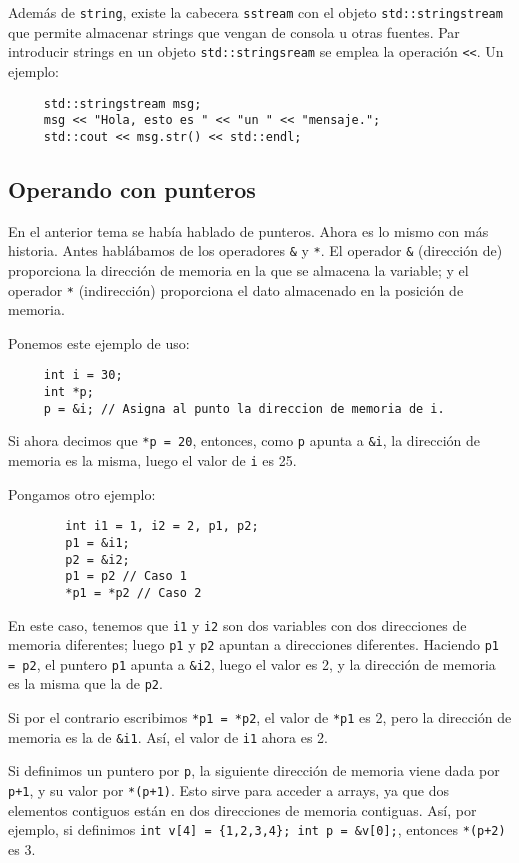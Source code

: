 \documentclass[a4paper]{article}
\begin{document}
	 Además de \verb|string|, existe la cabecera \verb|sstream| con el objeto \verb|std::stringstream| que permite almacenar strings que vengan de consola u otras fuentes. Par introducir strings en un objeto \verb|std::stringsream| se emplea la operación \verb|<<|. Un ejemplo:
	 \begin{verbatim}
	 std::stringstream msg;
	 msg << "Hola, esto es " << "un " << "mensaje.";
	 std::cout << msg.str() << std::endl;
	 \end{verbatim}
	 
	 \subsection{Operando con punteros}
	 En el anterior tema se había hablado de punteros. Ahora es lo mismo con más historia. Antes hablábamos de los operadores \verb|&| y \verb|*|. El operador \verb|&| (dirección de) proporciona la dirección de memoria en la que se almacena la variable; y el operador \verb|*| (indirección) proporciona el dato almacenado en la posición de memoria.
	 
	 Ponemos este ejemplo de uso:
	 \begin{lstlisting}
	 int i = 30;
	 int *p;
	 p = &i; // Asigna al punto la direccion de memoria de i.	 
	 \end{lstlisting}
	 
	 Si ahora decimos que \verb|*p = 20|, entonces, como \verb|p| apunta a \verb|&i|, la dirección de memoria es la misma, luego el valor de \verb|i| es 25.
	 
	 Pongamos otro ejemplo:
	 \begin{lstlisting}
	 	int i1 = 1, i2 = 2, p1, p2;
	 	p1 = &i1;
	 	p2 = &i2;
	 	p1 = p2 // Caso 1
	 	*p1 = *p2 // Caso 2
	 \end{lstlisting}
	 
	 En este caso, tenemos que \verb|i1| y \verb|i2| son dos variables con dos direcciones de memoria diferentes; luego \verb|p1| y \verb|p2| apuntan a direcciones diferentes. Haciendo \verb|p1 = p2|, el puntero \verb|p1| apunta a \verb|&i2|, luego el valor es 2, y la dirección de memoria es la misma que la de \verb|p2|.
	 
	 Si por el contrario escribimos \verb|*p1 = *p2|, el valor de \verb|*p1| es 2, pero la dirección de memoria es la de \verb|&i1|. Así, el valor de \verb|i1| ahora es 2.
	 
	 Si definimos un puntero por \verb|p|, la siguiente dirección de memoria viene dada por \verb|p+1|, y su valor por \verb|*(p+1)|. Esto sirve para acceder a arrays, ya que dos elementos contiguos están en dos direcciones de memoria contiguas. Así, por ejemplo, si definimos \verb|int v[4] = {1,2,3,4}; int p = &v[0];|, entonces \verb|*(p+2)| es 3.
	 
\end{document}
